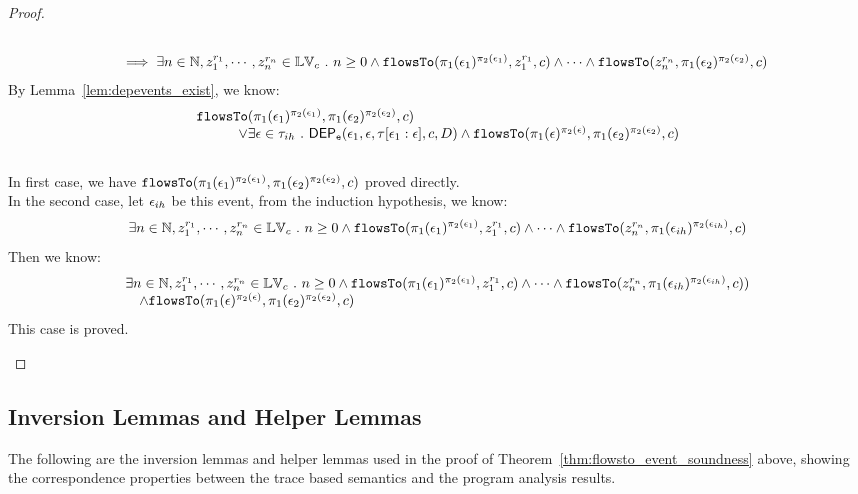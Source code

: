 \begin{proof}
\begin{case}
\[\begin{array}{l}
          \\ \quad 
          \implies 
          \exists n \in \mathbb{N}, z_1^{r_1}, \cdots, z_n^{r_n} \in \mathbb{LV}_{{c}} ~.~ n \geq 0 \land
          \mathtt{flowsTo}(\pi_1(\mathtt{\epsilon}_1)^{\pi_2(\mathtt{\epsilon}_1)},  z_1^{r_1}, c) 
          \land \cdots \land \mathtt{flowsTo}(z_n^{r_n}, \pi_1(\mathtt{\epsilon}_2)^{\pi_2(\mathtt{\epsilon}_2)}, c) 
        \end{array}
        \]
        By Lemma~\ref{lem:depevents_exist}, we know:
        \[
          \begin{array}{l}
            \mathtt{flowsTo}(\pi_1(\mathtt{\epsilon}_1)^{\pi_2(\mathtt{\epsilon}_1)}, \pi_1(\mathtt{\epsilon}_2)^{\pi_2(\mathtt{\epsilon}_2)}, c) 
        \\ \qquad \quad \lor
        \exists \mathtt{\epsilon} \in \mathtt{\tau}_{ih} ~.~ 
          \mathsf{DEP_{\mathtt{e}}}(\mathtt{\epsilon}_1, \mathtt{\epsilon}, \mathtt{\tau}[\mathtt{\epsilon}_1:\mathtt{\epsilon}], c, D)
        \land 
        \mathtt{flowsTo}(\pi_1(\mathtt{\epsilon})^{\pi_2(\mathtt{\epsilon})}, \pi_1(\mathtt{\epsilon}_2)^{\pi_2(\mathtt{\epsilon}_2)}, c) 
      \end{array}
      \]
        \\
        In first case, we have $\mathtt{flowsTo}(\pi_1(\mathtt{\epsilon}_1)^{\pi_2(\mathtt{\epsilon}_1)}, \pi_1(\mathtt{\epsilon}_2)^{\pi_2(\mathtt{\epsilon}_2)}, c) $ proved directly.
        \\
        In the second case, let $\mathtt{\epsilon}_{ih}$ be this event, from the induction hypothesis, we know:
        \[
          \exists n \in \mathbb{N}, z_1^{r_1}, \cdots, z_n^{r_n} \in \mathbb{LV}_{{c}} ~.~ n \geq 0 \land
            \mathtt{flowsTo}(\pi_1(\mathtt{\epsilon}_1)^{\pi_2(\mathtt{\epsilon}_1)},  z_1^{r_1}, c) 
            \land \cdots \land \mathtt{flowsTo}(z_n^{r_n}, \pi_1(\mathtt{\epsilon}_{ih})^{\pi_2(\mathtt{\epsilon}_{ih})}, c) 
          \]
          Then we know:
          \[
            \begin{array}{l}
              \exists n \in \mathbb{N}, z_1^{r_1}, \cdots, z_n^{r_n} \in \mathbb{LV}_{{c}} ~.~ n \geq 0 \land
            \mathtt{flowsTo}(\pi_1(\mathtt{\epsilon}_1)^{\pi_2(\mathtt{\epsilon}_1)},  z_1^{r_1}, c) 
            \land \cdots \land \mathtt{flowsTo}(z_n^{r_n}, \pi_1(\mathtt{\epsilon}_{ih})^{\pi_2(\mathtt{\epsilon}_{ih})}, c) )
             \\ \quad  
             \land  \mathtt{flowsTo}(\pi_1(\mathtt{\epsilon})^{\pi_2(\mathtt{\epsilon})}, \pi_1(\mathtt{\epsilon}_2)^{\pi_2(\mathtt{\epsilon}_2)}, c) 
            \end{array}
            \]
            This case is proved.
      \end{case}

\end{proof}

\subsection{Inversion Lemmas and Helper Lemmas}
The following are the inversion lemmas and helper lemmas used in the proof of Theorem~\ref{thm:flowsto_event_soundness} above,
showing the correspondence properties between the trace based semantics and the program analysis results.
